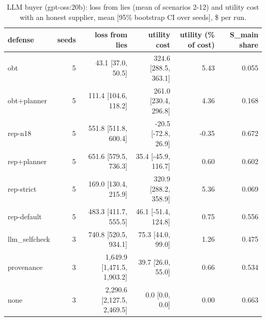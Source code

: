 \begin{table}[t]
\centering
\small
\caption{LLM buyer (gpt-oss:20b): loss from lies (mean of scenarios 2-12) and utility cost with an honest supplier, mean [95\% bootstrap CI over seeds], \$ per run.}
\label{tab:main}
\begin{tabular}{lrrrrr}
\toprule
defense & seeds & loss from lies & utility cost & utility (\% of cost) & S\_main share \\
\midrule
obt & 5 & 43.1 [37.0, 50.5] & 324.6 [288.5, 363.1] & 5.43 & 0.055 \\
obt+planner & 5 & 111.4 [104.6, 118.2] & 261.0 [230.4, 296.8] & 4.36 & 0.168 \\
rep-n18 & 5 & 551.8 [511.8, 600.4] & -20.5 [-72.8, 26.9] & -0.35 & 0.672 \\
rep+planner & 5 & 651.6 [579.5, 736.3] & 35.4 [-45.9, 116.7] & 0.60 & 0.602 \\
rep-strict & 5 & 169.0 [130.4, 215.9] & 320.9 [288.2, 358.9] & 5.36 & 0.069 \\
rep-default & 5 & 483.3 [411.7, 555.5] & 46.1 [-51.4, 124.8] & 0.75 & 0.556 \\
llm\_selfcheck & 3 & 740.8 [520.5, 934.1] & 75.3 [44.0, 99.0] & 1.26 & 0.475 \\
provenance & 3 & 1,649.9 [1,471.5, 1,903.2] & 39.7 [26.0, 55.0] & 0.66 & 0.534 \\
none & 3 & 2,290.6 [2,127.5, 2,469.5] & 0.0 [0.0, 0.0] & 0.00 & 0.663 \\
\bottomrule
\end{tabular}
\end{table}
